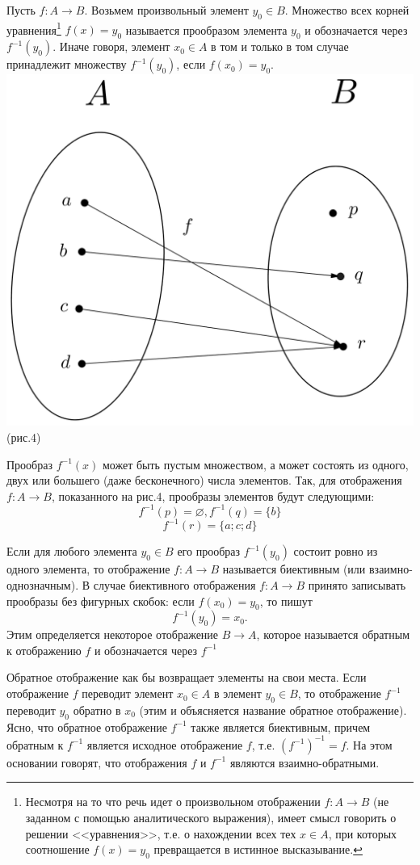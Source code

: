 \documentclass{article}
\begin{document}
\par Пусть $f\colon A\to B$. Возьмем произвольный элемент $y_0\in B$. Множество всех корней уравнения\footnote[1]{Несмотря на то что речь идет о произвольном отображении $f\colon A\to B$ (не заданном с помощью аналитического выражения), имеет смысл говорить о решении <<уравнения>>, т.е. о нахождении всех тех $x\in A$, при которых соотношение $f(x)=y_0$ превращается в истинное высказывание.} $f(x)=y_0$ называется прообразом элемента $y_0$ и обозначается через $f^{-1}(y_0)$. Иначе говоря, элемент $x_0\in A$ в том и только в том случае принадлежит множеству $f^{-1}(y_0)$, если $f(x_0)=y_0$.
\includegraphics[scale=0.25]{ovals.png}(рис.4)
\par Прообраз $f^{-1}(x)$ может быть пустым множеством, а может состоять из одного, двух или большего (даже бесконечного) числа элементов. Так, для отображения $f\colon A\to B$, показанного на рис.4, прообразы элементов будут следующими:
$$f^{-1}(p)=\varnothing, f^{-1}(q)=\{b\}$$
$$f^{-1}(r)=\{a; c; d\}$$
\par Если для любого элемента $y_0\in B$ его прообраз $f^{-1}(y_0)$ состоит ровно из одного элемента, то отображение $f\colon A\to B$ называется биективным (или взаимно-однозначным). В случае биективного отображения $f\colon A\to B$ принято записывать прообразы без фигурных скобок: если $f(x_0)=y_0$, то пишут
$$f^{-1}(y_0)=x_0.$$
Этим определяется некоторое отображение $B\to A$, которое называется обратным к отображению $f$ и обозначается через $f^{-1}$
\par Обратное отображение как бы возвращает элементы на свои места. Если отображение $f$ переводит элемент $x_0 \in A$ в элемент $y_0\in B$, то отображение $f^{-1}$ переводит $y_0$ обратно в $x_0$ (этим и объясняется название обратное отображение). Ясно, что обратное отображение $f^{-1}$ также является биективным, причем обратным к $f^{-1}$ является исходное отображение $f$, т.е. $(f^{-1})^{-1}=f$. На этом основании говорят, что отображения $f$ и $f^{-1}$ являются взаимно-обратными.
\end{document}
